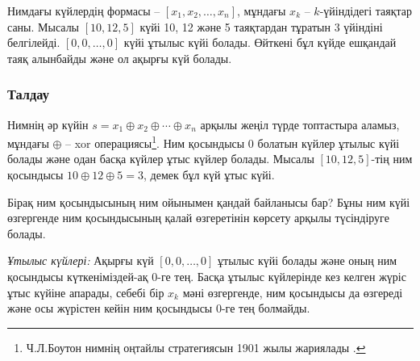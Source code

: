 Нимдағы күйлердің формасы -- $[x_1,x_2,\ldots,x_n]$,
мұндағы $x_k$ -- $k$-үйіндідегі таяқтар саны. Мысалы
$[10,12,5]$ күйі 10, 12 және 5 таяқтардан тұратын 3 үйіндіні
белгілейді. $[0,0,\ldots,0]$ күйі ұтылыс күйі болады. Өйткені бұл күйде ешқандай
таяқ алынбайды және ол ақырғы күй болады. 


\subsubsection{Талдау}

Нимнің әр күйін  $s = x_1 \oplus x_2 \oplus \cdots \oplus x_n$ арқылы жеңіл түрде топтастыра аламыз, мұндағы 
$\oplus$ -- xor операциясы\footnote{Ч.Л.Боутон нимнің оңтайлы стратегиясын 1901 жылы жариялады \cite{bou01}.}.
Ним қосындысы 0 болатын күйлер ұтылыс күйі болады 
және одан басқа күйлер ұтыс күйлер болады. Мысалы $[10,12,5]$-тің
ним қосындысы $10 \oplus 12 \oplus 5 = 3$, демек бұл күй ұтыс күйі.


Бірақ ним қосындысының ним ойынымен қандай байланысы бар?
Бұны ним күйі өзгергенде ним қосындысының 
қалай өзгеретінін көрсету арқылы түсіндіруге болады.  

\textit{Ұтылыс күйлері:}
Ақырғы күй $[0,0,\ldots,0]$ ұтылыс күйі болады 
және оның ним қосындысы күткеніміздей-ақ 0-ге тең. 
Басқа ұтылыс күйлерінде кез келген жүріс 
ұтыс күйіне апарады, себебі бір $x_k$ мәні өзгергенде,
ним қосындысы да өзгереді және осы жүрістен кейін
ним қосындысы 0-ге тең болмайды. 

